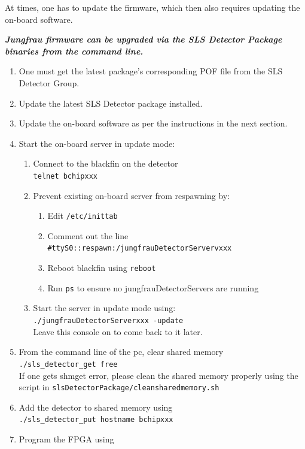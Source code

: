 \documentclass{article}
\begin{document}
At times, one has to update the firmware, which then also requires updating the
on-board software. 


\textbf{\textit{Jungfrau firmware can be upgraded via the SLS Detector Package
binaries from the command line.}}

\begin{enumerate}
  \item One must get the latest package's corresponding POF file from the SLS
Detector Group.
  \item Update the latest SLS Detector package installed.
  \item Update the on-board software as per the instructions in the next
section.
  \item Start the on-board server in update mode:
  \begin{enumerate}
    \item Connect to the blackfin on the detector\\ 
\verb=telnet bchipxxx=
    \item Prevent existing on-board server from respawning by:
    \begin{enumerate}
      \item Edit \verb=/etc/inittab= 
      \item Comment out the line
\verb=#ttyS0::respawn:/jungfrauDetectorServervxxx= 
      \item Reboot blackfin using \verb=reboot=
      \item Run \verb=ps= to ensure no jungfrauDetectorServers are running
    \end{enumerate}
    \item Start the server in update mode using: \\
\verb=./jungfrauDetectorServerxxx -update= \\
    Leave this console on to come back to it later.
  \end{enumerate}
  \item From the command line of the pc, clear shared memory \\
\verb=./sls_detector_get free= \\
  If one gets shmget error, please clean the shared memory properly using the
script in \verb=slsDetectorPackage/cleansharedmemory.sh=
  \item Add the detector to shared memory using \\
\verb=./sls_detector_put hostname bchipxxx=
  \item Program the FPGA using \\

\end{enumerate}
\end{document}
